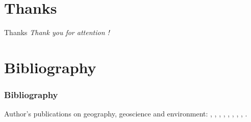 \documentclass[pdflatex,compress,8pt,
	xcolor={dvipsnames,dvipsnames,svgnames,x11names,table},
	hyperref={colorlinks = true,
	breaklinks = true, urlcolor = NavyBlue, breaklinks = true}]{beamer}
\begin{document}
\section{Thanks}
\begin{frame}{Thanks}
  	\centering \LARGE 
  	\emph{Thank you for attention !}\\
\end{frame}

\section{Bibliography}
\begin{frame}\frametitle{Bibliography}
\vspace{4em}
\scriptsize{Author's publications on geography, geoscience and environment: \cite{Lemenkova2006e}, \cite{Lemenkova2006b}, \cite{Lemenkova2006a}, \cite{Lemenkova2007b}, \cite{Lemenkova2004a}, \cite{Lemenkova2008b},  \cite{Lemenkova2005b1}, \cite{Lemenkova2005a}, \cite{Lemenkova2002b}.}
\printbibliography[heading=none]
\end{frame}


\end{document}
